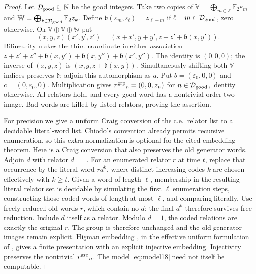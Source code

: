 \begin{proof}
Let $\mathcal D_{\rm good}\subseteq\mathbb N$ be the good integers. Take two copies of $\mathbb V=\bigoplus_{m\in\mathbb Z}\mathbb F_2\varepsilon_m$ and $\mathbb W=\bigoplus_{k\in\mathcal D_{\rm good}}\mathbb F_2z_k$. Define $\mathfrak b(\varepsilon_m,\varepsilon_\ell)=z_{\ell-m}$ if $\ell-m\in\mathcal D_{\rm good}$, zero otherwise. On $\mathbb V\oplus \mathbb V\oplus \mathbb W$ put
\begin{equation}\label{eq:model18}
 (x,y,z)(x',y',z')=(x+x',y+y',z+z'+\mathfrak b(x,y')).
\end{equation}
Bilinearity makes the third coordinate in either association $z+z'+z''+\mathfrak b(x,y')+\mathfrak b(x,y'')+\mathfrak b(x',y'')$. The identity is $(0,0,0)$; the inverse of $(x,y,z)$ is $(x,y,z+\mathfrak b(x,y))$. Simultaneously shifting both $\mathbb V$ indices preserves $\mathfrak b$; adjoin this automorphism as $a$. Put $b=(\varepsilon_0,0,0)$ and $c=(0,\varepsilon_0,0)$. Multiplication gives ${r^{\rm grp}}_n=(0,0,z_n)$ for $n\in\mathcal D_{\rm good}$, identity otherwise. All relators hold, and every good word has a nontrivial order-two image. Bad words are killed by listed relators, proving the assertion.

For precision we give a uniform Craig conversion \cite{Craig} of the c.e.\ relator list to a decidable literal-word list. Chiodo's convention already permits recursive enumeration, so this extra normalization is optional for the cited embedding theorem. Here is a Craig conversion that also preserves the old generator words. Adjoin $d$ with relator $d=1$. For an enumerated relator $r$ at time $t$, replace that occurrence by the literal word $r d^k$, where distinct increasing codes $k$ are chosen effectively with $k\geq t$. Given a word of length $\ell$, membership in the resulting literal relator set is decidable by simulating the first $\ell$ enumeration steps, constructing those coded words of length at most $\ell$, and comparing literally. Use freely reduced old words $r$, which contain no $d$; the final $d^k$ therefore survives free reduction. Include $d$ itself as a relator. Modulo $d=1$, the coded relations are exactly the original $r$. The group is therefore unchanged and the old generator images remain explicit. Higman embedding \cite{Higman}, in the effective uniform formulation of \cite[Theorem 2.2]{Chiodo}, gives a finite presentation with an explicit injective embedding. Injectivity preserves the nontrivial ${r^{\rm grp}}_n$. The model \eqref{eq:model18} need not itself be computable.
\end{proof}

